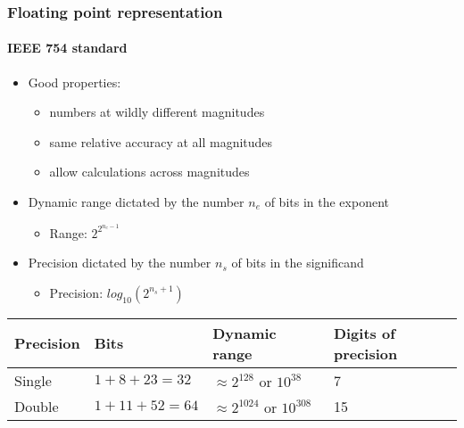 \documentclass[9pt]{beamer}
\begin{document}
\begin{frame}
  \frametitle{Floating point representation}
  \framesubtitle{IEEE 754 standard}
  \begin{itemize}
  \item Good properties:
    \begin{itemize}
    \item numbers at wildly different magnitudes
    \item same relative accuracy at all magnitudes
    \item allow calculations across magnitudes
    \end{itemize}
  \item Dynamic range dictated by the number $n_e$ of bits in the exponent
    \begin{itemize}
    \item[] Range: $2^{2^{n_e - 1}}$
    \end{itemize}
  \item Precision dictated by the number $n_s$ of bits in the significand
    \begin{itemize}
    \item[] Precision: $log_{10} (2^{n_s + 1})$
    \end{itemize}
  \end{itemize}

  \bigskip
  
  \centering\begin{tabular}{llll}
    \hline
    Precision & Bits & Dynamic range & Digits of precision\\
    \hline
    \hline
    Single & $1 + 8 + 23 = 32$ & $\approx 2^{128} \text{ or } 10^{38}$ &
    7 \\
    Double & $1 + 11 + 52 = 64$ & $\approx 2^{1024} \text{ or } 10^{308}$ &
    15 \\
    \hline
  \end{tabular}
\end{frame}
\end{document}
